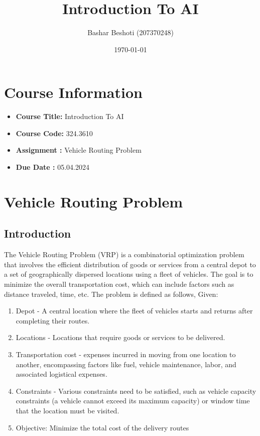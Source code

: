 \documentclass[letterpaper, 12pt]{article}
\title{Introduction To AI}
\author{Bashar Beshoti (207370248)
}
\date{\today}
\begin{document}
\maketitle

\section*{Course Information}
\begin{itemize}
    \item \textbf{Course Title:} Introduction To AI
    \item \textbf{Course Code:} 324.3610
    \item \textbf{Assignment :} Vehicle Routing Problem
    \item     \textbf{Due Date : } 05.04.2024

\end{itemize}


\newpage

\section*{Vehicle Routing Problem}
\subsection*{Introduction}
The Vehicle Routing Problem (VRP) is a combinatorial optimization problem that involves the efficient distribution of goods or services from a central depot to a set of geographically dispersed locations using a fleet of vehicles. The goal is to minimize the overall transportation cost, which can include factors such as distance traveled, time, etc.
The problem is defined as follows, Given:

\begin{enumerate}
    \item Depot - A central location where the fleet of vehicles starts and returns after completing their routes.
    \item Locations - Locations that require goods or services to be delivered.
    \item Transportation cost - expenses incurred in moving from one location to another, encompassing factors like fuel, vehicle maintenance, labor, and associated logistical expenses.
    \item Constraints - Various constraints need to be satisfied, such as vehicle capacity constraints (a vehicle cannot exceed its maximum capacity) or window time that the location must be visited.
    \item Objective: Minimize the total cost of the delivery routes
\end{enumerate}
\end{document}
